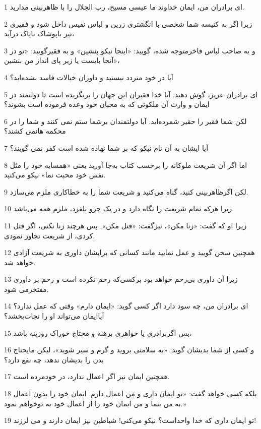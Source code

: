 \par 1 ای برادران من، ایمان خداوند ما عیسی مسیح، رب الجلال را با ظاهربینی مدارید.
\par 2 زیرا اگر به کنیسه شما شخصی با انگشتری زرین و لباس نفیس داخل شود و فقیری نیز باپوشاک ناپاک درآید،
\par 3 و به صاحب لباس فاخرمتوجه شده، گویید: «اینجا نیکو بنشین» و به فقیرگویید: «تو در آنجا بایست یا زیر پای انداز من بنشین»،
\par 4 آیا در خود متردد نیستید و داوران خیالات فاسد نشده‌اید؟
\par 5 ‌ای برادران عزیز، گوش دهید. آیا خدا فقیران این جهان را برنگزیده است تا دولتمند در ایمان و وارث آن ملکوتی که به محبان خود وعده فرموده است بشوند؟
\par 6 لکن شما فقیر را حقیر شمرده‌اید. آیا دولتمندان برشما ستم نمی کنند و شما را در محکمه هانمی کشند؟
\par 7 آیا ایشان به آن نام نیکو که بر شما نهاده شده است کفر نمی گویند؟
\par 8 اما اگر آن شریعت ملوکانه را برحسب کتاب به‌جا آورید یعنی «همسایه خود را مثل نفس خود محبت نما» نیکو می‌کنید.
\par 9 لکن اگرظاهربینی کنید، گناه می‌کنید و شریعت شما را به خطاکاری ملزم می‌سازد.
\par 10 زیرا هرکه تمام شریعت را نگاه دارد و در یک جزو بلغزد، ملزم همه می‌باشد.
\par 11 زیرا او که گفت: «زنا مکن»، نیزگفت: «قتل مکن». پس هرچند زنا نکنی، اگر قتل کردی، از شریعت تجاوز نمودی.
\par 12 همچنین سخن گویید و عمل نمایید مانند کسانی که برایشان داوری به شریعت آزادی خواهد شد.
\par 13 زیرا آن داوری بی‌رحم خواهد بود برکسی‌که رحم نکرده است و رحم بر داوری مفتخرمی شود.
\par 14 ‌ای برادران من، چه سود دارد اگر کسی گوید: «ایمان دارم» وقتی که عمل ندارد؟ آیاایمان می‌تواند او را نجات‌بخشد؟
\par 15 پس اگربرادری یا خواهری برهنه و محتاج خوراک روزینه باشد،
\par 16 و کسی از شما بدیشان گوید: «به سلامتی بروید و گرم و سیر شوید»، لیکن مایحتاج بدن را بدیشان ندهد، چه نفع دارد؟
\par 17 همچنین ایمان نیز اگر اعمال ندارد، در خودمرده است.
\par 18 بلکه کسی خواهد گفت: «تو ایمان داری و من اعمال دارم. ایمان خود را بدون اعمال به من بنما و من ایمان خود را از اعمال خود به توخواهم نمود.»
\par 19 تو ایمان داری که خدا واحداست؟ نیکو می‌کنی! شیاطین نیز ایمان دارند و می لرزند!

